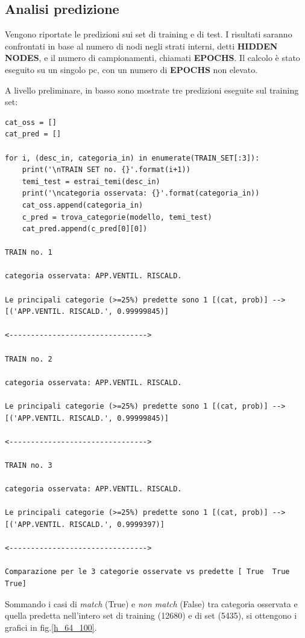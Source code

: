 \documentclass[10pt,a4paper]{report}
\begin{document}
\subsection*{Analisi predizione}

Vengono riportate le predizioni sui set di training e di test. I risultati saranno confrontati in base al numero di nodi negli strati interni, detti \textbf{HIDDEN NODES}, e il numero di campionamenti, chiamati \textbf{EPOCHS}.
Il calcolo è stato eseguito su un singolo pc, con un numero di \textbf{EPOCHS} non elevato. 

A livello preliminare, in basso sono mostrate tre predizioni eseguite sul training set:
\begin{verbatim}
cat_oss = []
cat_pred = []

for i, (desc_in, categoria_in) in enumerate(TRAIN_SET[:3]):
    print('\nTRAIN SET no. {}'.format(i+1))
    temi_test = estrai_temi(desc_in)
    print('\ncategoria osservata: {}'.format(categoria_in))
    cat_oss.append(categoria_in)
    c_pred = trova_categorie(modello, temi_test)
    cat_pred.append(c_pred[0][0])

TRAIN no. 1

categoria osservata: APP.VENTIL. RISCALD.

Le principali categorie (>=25%) predette sono 1 [(cat, prob)] --> 
[('APP.VENTIL. RISCALD.', 0.99999845)]

<-------------------------------->

TRAIN no. 2

categoria osservata: APP.VENTIL. RISCALD.

Le principali categorie (>=25%) predette sono 1 [(cat, prob)] --> 
[('APP.VENTIL. RISCALD.', 0.99999845)]

<-------------------------------->

TRAIN no. 3

categoria osservata: APP.VENTIL. RISCALD.

Le principali categorie (>=25%) predette sono 1 [(cat, prob)] --> 
[('APP.VENTIL. RISCALD.', 0.9999397)]

<-------------------------------->

Comparazione per le 3 categorie osservate vs predette [ True  True  True]
\end{verbatim}

Sommando i casi di \textit{match} (True) e \textit{non match} (False) tra categoria osservata e quella predetta nell'intero set di training (12680) e di set (5435), si ottengono i grafici in fig.\ref{h_64_100}.
\end{document}

